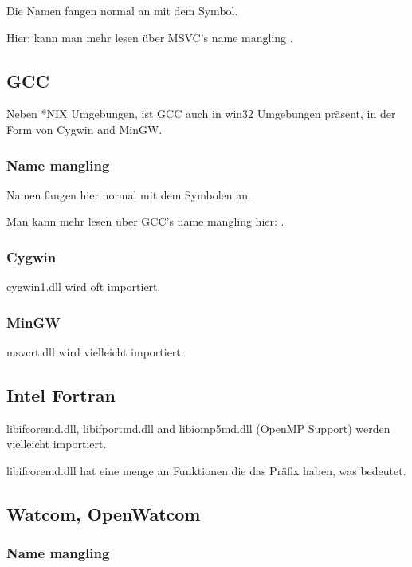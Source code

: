 Die Namen fangen normal an mit dem  Symbol.

Hier:  kann man mehr lesen \"uber MSVC's \gls{name mangling} . 

\subsection{GCC}

Neben *NIX Umgebungen, ist GCC auch in win32 Umgebungen pr\"asent, in der Form von Cygwin and MinGW. 

\subsubsection{Name mangling} 

Namen fangen hier normal mit dem  Symbolen an.

Man kann mehr lesen \"uber GCC's \gls{name mangling} hier: .

\subsubsection{Cygwin}

cygwin1.dll wird oft importiert.

\subsubsection{MinGW}

msvcrt.dll wird vielleicht importiert.

\subsection{Intel Fortran}


libifcoremd.dll, libifportmd.dll and libiomp5md.dll (OpenMP Support) werden vielleicht importiert.

libifcoremd.dll hat eine menge an Funktionen die das  Pr\"afix haben, was  bedeutet.

\subsection{Watcom, OpenWatcom}

\subsubsection{Name mangling}

